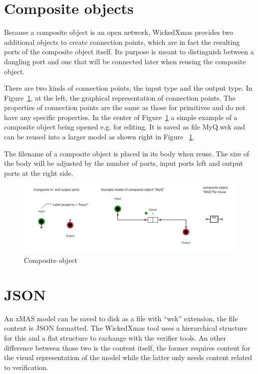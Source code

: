 \documentclass[a4paper,11pt,final]{article}
\begin{document}
\section{Composite objects}
Because a composite object is an open network, WickedXmas provides two
additional objects to create connection points, which are in fact the resulting
ports of the composite object itself. Its purpose is meant to distinguish between a
dangling port and one that will be connected later when reusing the
composite object.

There are two kinds of connection points, the input type and the output type.
In Figure~\ref{fig:CompObj}, at the left, the graphical
representation of connection points. The properties of connection points are
the same as those for primitives and do not have any specific properties.
In the center of Figure~\ref{fig:CompObj} a simple example of a
composite object being opened e.g. for editing. It is saved as file MyQ.wck
and can be reused into a larger model as shown right in Figure ~\ref{fig:CompObj}.

The filename of a composite object is placed in its body when reuse.
The size of the body will be adjusted by the number of ports,
input ports left and output ports at the right side.


\begin{figure}[here]
\includegraphics[width=1.0\textwidth]{CompObj}
\caption{Composite object}
\label{fig:CompObj}
\end{figure}


\newpage
\section{JSON}

An xMAS model  can be saved to disk as a file with ``wck'' extension, the file content is JSON formatted.
The WickedXmas tool uses a hierarchical structure for this and a flat structure to exchange with the verifier
tools.
An other difference between those two is the content itself, the former requires content for the
visual representation of the model while the latter only needs content related to verification.
\end{document}
